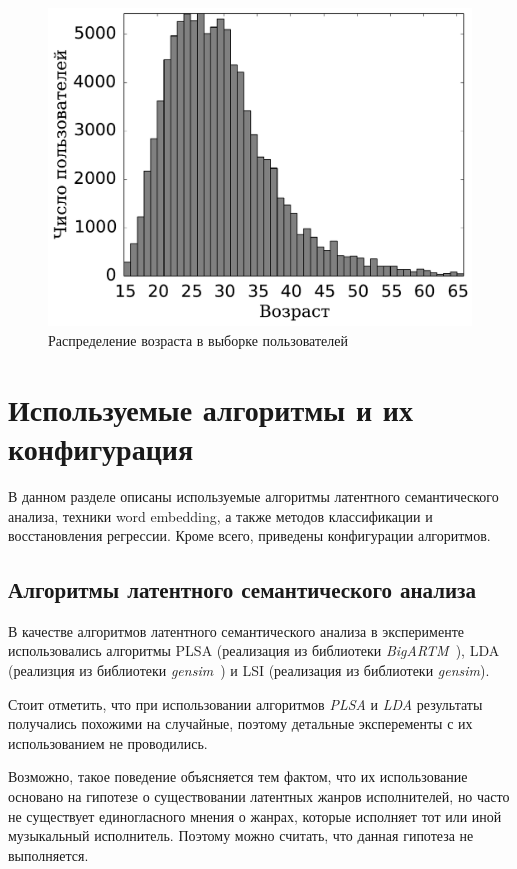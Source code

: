 \begin{figure}[!h]
\caption{Распределение возраста в выборке пользователей}
\label{fig:age_histogram}
\centering
\includegraphics[scale=0.60]{figs/age-histogram.pdf}
\end{figure}

\section{Используемые алгоритмы и их конфигурация}
\label{sec:algorithms_config}

В данном разделе описаны используемые алгоритмы латентного
семантического анализа, техники word embedding, а также методов
классификации и восстановления регрессии. Кроме всего, приведены
конфигурации алгоритмов.

\subsection{Алгоритмы латентного семантического анализа}

В качестве алгоритмов латентного семантического анализа
в эксперименте использовались алгоритмы PLSA (реализация из библиотеки
\textit{BigARTM}~\cite{bigartm}), LDA (реализция из библиотеки
\textit{gensim}~\cite{gensim}) и LSI (реализация из библиотеки
\textit{gensim}).

Стоит отметить, что при использовании алгоритмов
\textit{PLSA} и \textit{LDA} результаты получались похожими 
на случайные, поэтому детальные эксперементы с их 
использованием не проводились. 

Возможно, такое поведение объясняется тем фактом, 
что их использование основано на гипотезе о существовании 
латентных жанров исполнителей, но часто не существует единогласного 
мнения о жанрах, которые исполняет тот или иной музыкальный исполнитель.
Поэтому можно считать, что данная гипотеза не выполняется.

